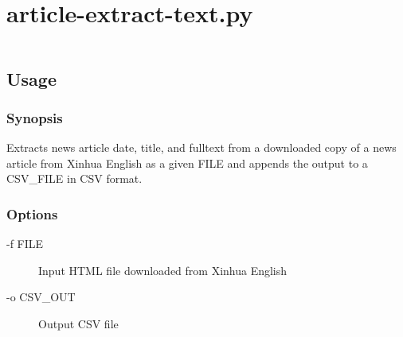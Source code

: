 \appendix
\chapter{article-extract-text.py}\label{adx:python-script}

\inputminted[linenos]{python}{../article-extract-text.py}

\section{Usage}

\subsection{Synopsis}

Extracts news article date, title, and fulltext from a downloaded copy
of a news article from Xinhua English as a given FILE and appends the
output to a CSV\_FILE in CSV format.

\subsection{Options}

\begin{description}
	\item [-f FILE] Input HTML file downloaded from Xinhua English
	\item [-o CSV\_OUT] Output CSV file
\end{description}

